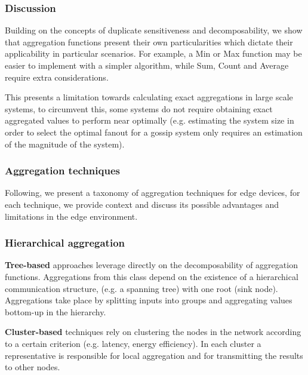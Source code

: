 \subsubsection{Discussion}

Building on the concepts of duplicate sensitiveness and decomposability, we show that aggregation functions present their own particularities which dictate their applicability in particular scenarios. For example, a Min or Max function may be easier to implement with a simpler algorithm, while Sum, Count and Average require extra considerations. 

This presents a limitation towards calculating exact aggregations in large scale systems, to circumvent this, some systems do not require obtaining exact aggregated values to perform near optimally (e.g. estimating the system size in order to select the optimal fanout for a gossip system only requires an estimation of the magnitude of the system). 

\subsubsection{Aggregation techniques}

Following, we present a taxonomy of aggregation techniques for edge devices, for each technique, we provide context and discuss its possible advantages and limitations in the edge environment.

\subsubsection*{Hierarchical aggregation}

\textbf{Tree-based} approaches leverage directly on the decomposability of aggregation functions. Aggregations from this class depend on the existence of a hierarchical communication structure, (e.g. a spanning tree) with one root (sink node). Aggregations take place by splitting inputs into groups and aggregating values bottom-up in the hierarchy. 


\textbf{Cluster-based} techniques rely on clustering the nodes in the network according to a certain criterion (e.g. latency, energy efficiency). In each cluster a representative is responsible for local aggregation and for transmitting the results to other nodes. 

